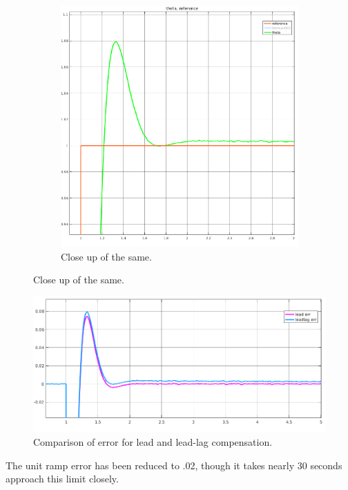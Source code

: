 \documentclass[11pt,a4paper]{article}
\begin{document}
\begin{figure}[!htbp]
\begin{subfigure}{.5\textwidth}
		\includegraphics[width = \textwidth]{imglab/lab4sol_trajleadlagstepclose.png}
		\caption{Close up of the same.}	
	\end{subfigure}
\end{figure}


\begin{figure}[!htbp]
	\includegraphics[width=\textwidth]{imglab/lab4sol_trajleadvleadlag.png}
	\caption{Comparison of error for lead and lead-lag compensation.}
\end{figure}

The unit ramp error has been reduced to .02, though it takes nearly 30 seconds approach this limit closely.
\end{document}
